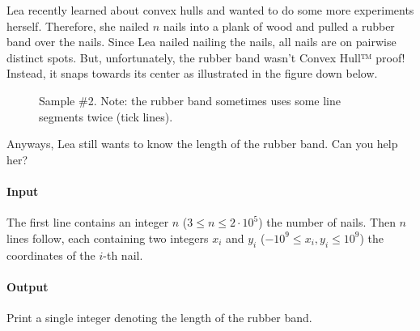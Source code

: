 
\usepackage{tkz-euclide}



\makeheader

Lea recently learned about convex hulls and wanted to
do some more experiments herself.
Therefore, she nailed $n$ nails into a plank of wood and
pulled a rubber band over the nails.
Since Lea nailed nailing the nails, all nails are on
pairwise distinct spots.
But, unfortunately, the rubber band wasn't Convex Hull™ proof!
Instead, it snaps towards its center as illustrated in the figure down below.
\begin{figure}[ht]
  \centering
  \caption{Sample \#2. Note: the rubber band sometimes uses some line segments twice (tick lines).}
  \label{fig:convexhull}
\end{figure}
Anyways, Lea still wants to know the length of the rubber band.
Can you help her?

\paragraph*{Input}

The first line contains an integer $n$ ($3 \leq n \leq 2\cdot10^5$) the number of nails.
Then $n$ lines follow, each containing two integers $x_i$ and $y_i$ ($-10^9 \leq x_i, y_i \leq 10^9$)
the coordinates of the $i$-th nail.

\paragraph*{Output}

Print a single integer denoting the length of the rubber band.

\begin{samples}
\end{samples}

